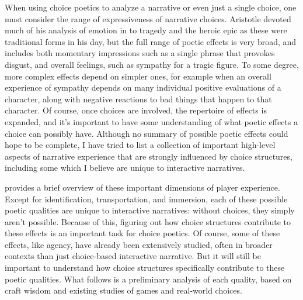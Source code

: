 When using choice poetics to analyze a narrative or even just a single choice, one must consider the range of expressiveness of narrative choices.
%
Aristotle devoted much of his analysis of emotion in  to tragedy and the heroic epic as these were traditional forms in his day, but the full range of poetic effects is very broad, and includes both momentary impressions such as a single phrase that provokes disgust, and overall feelings, such as sympathy for a tragic figure.
%
To some degree, more complex effects depend on simpler ones, for example when an overall experience of sympathy depends on many individual positive evaluations of a character, along with negative reactions to bad things that happen to that character.
%
Of course, once choices are involved, the repertoire of effects is expanded, and it's important to have some understanding of what poetic effects a choice can possibly have.
%
Although no summary of possible poetic effects could hope to be complete, I have tried to list a collection of important high-level aspects of narrative experience that are strongly influenced by choice structures, including some which I believe are unique to interactive narratives.


 provides a brief overview of these important dimensions of player experience.
%
Except for identification, transportation, and immersion, each of these possible poetic qualities are unique to interactive narratives: without choices, they simply aren't possible.
%
Because of this, figuring out how choice structures contribute to these effects 
is an important task for choice poetics.
%
Of course, some of these effects, like agency, have already been extensively studied, often in broader contexts than just choice-based interactive narrative.
%
But it will still be important to understand how choice structures specifically contribute to these poetic qualities.
%
What follows is a preliminary analysis of each quality, based on craft wisdom and existing studies of games and real-world choices.

